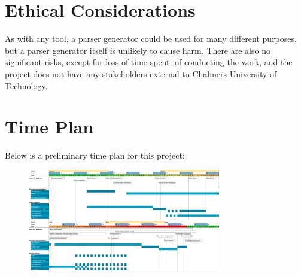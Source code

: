 \documentclass{article}
\begin{document}

\section{Ethical Considerations}

	As with any tool, a parser generator could be used for many different
	purposes, but a parser generator itself is unlikely to cause harm. There
	are also no significant risks, except for loss of time spent, of conducting
	the work, and the project does not have any stakeholders external to
	Chalmers University of Technology.

\section{Time Plan}

	Below is a preliminary time plan for this project:

	\begin{figure}
		\centering
		\includegraphics[angle=-90,width=0.75\textwidth]{gantt.png}
	\end{figure}

\newpage




\end{document}
